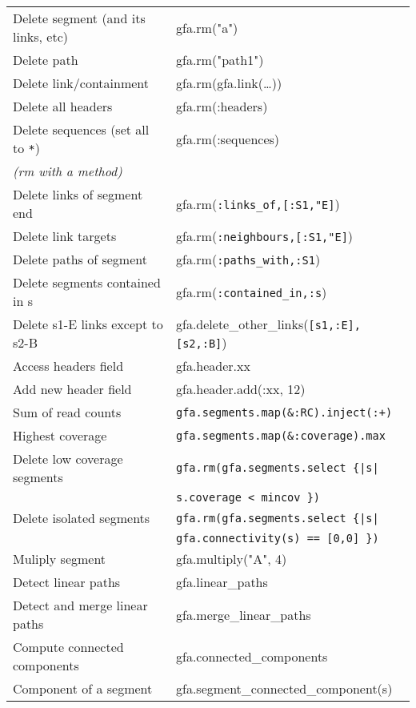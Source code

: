 \documentclass[12pt]{scrartcl}
\begin{document}
\begin{tabular}{|l|>{\ttfamily}l|}
  \hline
  Delete segment (and its links, etc) & gfa.rm("a") \\
  Delete path & gfa.rm("path1") \\
  Delete link/containment  & gfa.rm(gfa.link(\ldots)) \\
  Delete all headers & gfa.rm(:headers) \\
  Delete sequences (set all to \texttt{*}) & gfa.rm(:sequences) \\
  \hline
  \textit{(rm with a method)} &\\
  Delete links of segment end & gfa.rm(\verb/:links_of,[:S1,"E]/) \\
  Delete link targets  & gfa.rm(\verb/:neighbours,[:S1,"E]/) \\
  Delete paths of segment & gfa.rm(\verb/:paths_with,:S1/) \\
  Delete segments contained in s & gfa.rm(\verb/:contained_in,:s/) \\
  Delete s1-E links except to s2-B & gfa.delete\_other\_links(\verb/[s1,:E],[s2,:B]/)\\
  \hline
  Access headers field & gfa.header.xx \\
  Add new header field & gfa.header.add(:xx, 12)\\
  \hline
  Sum of read counts & \verb/gfa.segments.map(&:RC).inject(:+)/ \\
  Highest coverage & \verb/gfa.segments.map(&:coverage).max/ \\
  Delete low coverage segments & \verb/gfa.rm(gfa.segments.select {|s|/ \\
                               & \hspace{2.7cm}\verb/s.coverage < mincov })/ \\
  Delete isolated segments & \verb/gfa.rm(gfa.segments.select {|s|/ \\
                      & \hspace{1cm}\verb/gfa.connectivity(s) == [0,0] })/ \\
  \hline
  Muliply segment & gfa.multiply("A", 4) \\
  Detect linear paths & gfa.linear\_paths \\
  Detect and merge linear paths & gfa.merge\_linear\_paths \\
  Compute connected components & gfa.connected\_components \\
  Component of a segment & gfa.segment\_connected\_component(s) \\

\end{tabular}
\end{document}
